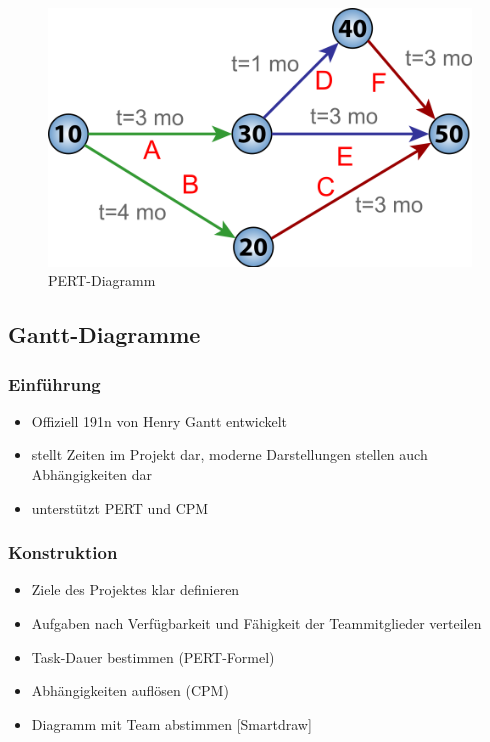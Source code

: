 \documentclass[%
	handout
]{beamer}
\newcommand{\howtogantt}{[Smartdraw]}
\begin{document}
		\begin{frame}
			\begin{figure}
				\begin{center}
					\includegraphics[scale=.2]{../images/pert.png}
					\caption{PERT-Diagramm}
					\label{img:pert}
				\end{center}
			\end{figure}
		\end{frame}
		
	\subsection{Gantt-Diagramme}
		\begin{frame}
			\frametitle{Einführung}
			\begin{itemize}
				\item Offiziell 191n von Henry Gantt entwickelt\pause
				\item stellt Zeiten im Projekt dar\pause, moderne Darstellungen stellen auch Abhängigkeiten dar\pause
				\item unterstützt PERT und CPM
			\end{itemize}
		\end{frame}
		
		\begin{frame}
			\frametitle{Konstruktion}
			\begin{itemize}
				\item Ziele des Projektes klar definieren\pause
				\item Aufgaben nach Verfügbarkeit und Fähigkeit der Teammitglieder verteilen\pause
				\item Task-Dauer bestimmen (PERT-Formel)\pause
				\item Abhängigkeiten auflösen (CPM)\pause
				\item Diagramm mit Team abstimmen \howtogantt
			\end{itemize}
		\end{frame}
		
\end{document}
